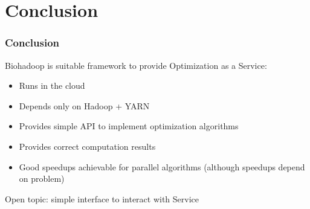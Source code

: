 \section{Conclusion}
\begin{frame}
  \frametitle{Conclusion}
  Biohadoop is suitable framework to provide Optimization as a Service:
  \begin{itemize}
    \item Runs in the cloud
    \item Depends only on Hadoop + YARN
    \item Provides simple API to implement optimization algorithms
    \item Provides correct computation results
    \item Good speedups achievable for parallel algorithms (although speedups depend on problem)
  \end{itemize}
  Open topic: simple interface to interact with Service
\end{frame}